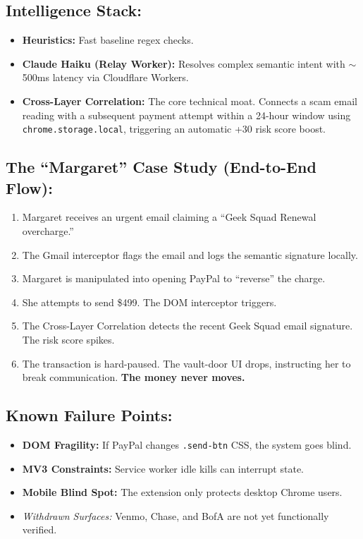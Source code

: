 \documentclass[11pt, letterpaper]{article}
\begin{document}
\subsection*{Intelligence Stack:}
\begin{itemize}
    \item \textbf{Heuristics:} Fast baseline regex checks.
    \item \textbf{Claude Haiku (Relay Worker):} Resolves complex semantic intent with $\sim$500ms latency via Cloudflare Workers.
    \item \textbf{Cross-Layer Correlation:} The core technical moat. Connects a scam email reading with a subsequent payment attempt within a 24-hour window using \texttt{chrome.storage.local}, triggering an automatic +30 risk score boost.
\end{itemize}

\subsection*{The ``Margaret'' Case Study (End-to-End Flow):}
\begin{enumerate}
    \item Margaret receives an urgent email claiming a ``Geek Squad Renewal overcharge.''
    \item The Gmail interceptor flags the email and logs the semantic signature locally.
    \item Margaret is manipulated into opening PayPal to ``reverse'' the charge.
    \item She attempts to send \$499. The DOM interceptor triggers.
    \item The Cross-Layer Correlation detects the recent Geek Squad email signature. The risk score spikes.
    \item The transaction is hard-paused. The vault-door UI drops, instructing her to break communication. \textbf{The money never moves.}
\end{enumerate}

\subsection*{Known Failure Points:}
\begin{itemize}
    \item \textbf{DOM Fragility:} If PayPal changes \texttt{.send-btn} CSS, the system goes blind.
    \item \textbf{MV3 Constraints:} Service worker idle kills can interrupt state.
    \item \textbf{Mobile Blind Spot:} The extension only protects desktop Chrome users.
    \item \textit{Withdrawn Surfaces:} Venmo, Chase, and BofA are not yet functionally verified.
\end{itemize}
\end{document}
